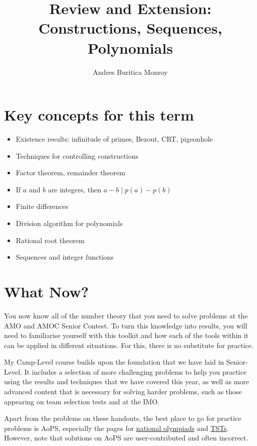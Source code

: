 \documentclass{article}
\title{Review and Extension: Constructions, Sequences, Polynomials}
\author{Andres Buritica Monroy}
\date{}
\begin{document}
\maketitle
\section{Key concepts for this term}
\begin{itemize}
  \item Existence results: infinitude of primes, Bezout, CRT, pigeonhole
  \item Techniques for controlling constructions
  \item Factor theorem, remainder theorem
  \item If $a$ and $b$ are integers, then $a-b\mid p(a)-p(b)$
  \item Finite differences
  \item Division algorithm for polynomials
  \item Rational root theorem
  \item Sequences and integer functions
\end{itemize}
\section{What Now?}
You now know all of the number theory that you need to solve problems at
the AMO and AMOC Senior Contest. To turn this knowledge into results, you will
need to familiarise yourself with this toolkit and how each of the tools within it
can be applied in different situations. For this, there is no substitute for
practice.

My Camp-Level course builds upon the foundation that we have laid in
Senior-Level. It includes a selection of more challenging problems to help you
practice using the results and techniques that we have covered this year, as
well as more advanced content that is necessary for solving harder
problems, such as those appearing on team selection tests and at the IMO\@.

Apart from the problems on these handouts, the best place to go for
practice problems is AoPS, especially
the pages for \href{https://artofproblemsolving.com/community/c58}{national
olympiads} and \href{https://artofproblemsolving.com/community/c59}{TSTs}.
However, note that solutions on AoPS are user-contributed and often incorrect.
\end{document}
